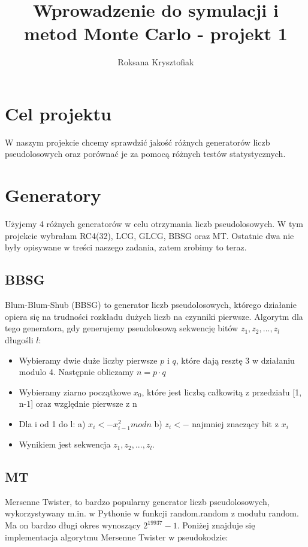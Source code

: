 \documentclass[12pt]{mwart}\usepackage[]{graphicx}\usepackage[]{xcolor}
\author{Roksana Krysztofiak}
\title{Wprowadzenie do symulacji i metod Monte Carlo - projekt 1}
\begin{document}
\maketitle

\section*{Cel projektu}
W naszym projekcie chcemy sprawdzić jakość różnych generatorów liczb pseudolosowych oraz porównać je za pomocą różnych testów statystycznych.

\section*{Generatory}
Użyjemy 4 różnych generatorów w celu otrzymania liczb pseudolosowych. W tym projekcie wybrałam RC4(32), LCG, GLCG, BBSG oraz MT. Ostatnie dwa nie były opisywane w treści naszego zadania, zatem zrobimy to teraz.

\subsection*{BBSG}
Blum-Blum-Shub (BBSG) to generator liczb pseudolosowych, którego działanie opiera się na trudności rozkładu dużych liczb na czynniki pierwsze. Algorytm dla tego generatora, gdy generujemy pseudolosową sekwencję bitów $z_1, z_2, ..., z_l$ długośli $l$:
\begin{itemize}
  \item Wybieramy dwie duże liczby pierwsze $p$ i $q$, które dają resztę 3 w działaniu modulo 4. Następnie obliczamy $n = p \cdot q$

  \item Wybieramy ziarno początkowe $x_0$, które jest liczbą całkowitą z przedziału [1, n-1] oraz względnie pierwsze z n
  \item Dla i od 1 do l: \newline
    a) $x_i <- x_{i-1}^2 mod n$ \newline
    b) $z_i <-$ najmniej znaczący bit z $x_i$
  \item Wynikiem jest sekwencja $z_1, z_2, ..., z_l.$
    
\end{itemize}
\subsection*{MT}
Mersenne Twister, to bardzo popularny generator liczb pseudolosowych, wykorzystywany m.in. w Pythonie w funkcji random.random z modułu random. Ma on bardzo długi okres wynoszący $2^{19937}-1$. 
Poniżej znajduje się implementacja algorytmu Mersenne Twister w pseudokodzie:
\end{document}
